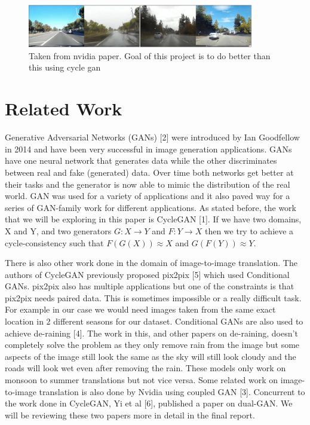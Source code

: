 \documentclass{article}
\begin{document}
 \begin{figure}[htb!]
  \centering
  \includegraphics[width=99mm]{image.png}
  \caption{Taken from nvidia paper. Goal of this project is to do better 
  than this using cycle gan \label{overflow}}
\end{figure}

\section{Related Work}
\label{gen_inst}

Generative Adversarial Networks (GANs) [2] were introduced by 
Ian Goodfellow in 2014 and have been very successful in image generation 
applications. GANs have one neural network that generates data while the 
other discriminates between real and fake (generated) data. Over time 
both networks get better at their tasks and the generator is now able to 
mimic the distribution of the real world. GAN was used for a variety of 
applications and it also paved way for a series of GAN-family work for 
different applications. As stated before, the work that we will be 
exploring in this paper is CycleGAN [1]. If we have two domains, X and Y, 
and two generators $G: X \rightarrow Y$ and $F: Y \rightarrow  X$ then we try to achieve a 
cycle-consistency such that $F(G(X)) \approx X$ and $G(F(Y)) \approx Y$.

There is also other work done in the domain of image-to-image translation. 
The authors of CycleGAN previously proposed pix2pix [5] which used 
Conditional GANs. pix2pix also has multiple applications but one of 
the constraints is that pix2pix needs paired data. This is sometimes 
impossible or a really difficult task. For example in our case we 
would need images taken from the same exact location in 2 different 
seasons for our dataset. Conditional GANs are also used to achieve 
de-raining [4]. The work in this, and other papers on de-raining, 
doesn’t completely solve the problem as they only remove rain from 
the image but some aspects of the image still look the same as 
the sky will still look cloudy and the roads will look wet even 
after removing the rain. These models only work on monsoon to summer 
translations but not vice versa. Some related work on image-to-image 
translation is also done by Nvidia using coupled GAN [3]. Concurrent 
to the work done in CycleGAN, Yi et al [6], published a paper on dual-GAN. 
We will be reviewing these two papers more in detail in the final report.
\end{document}
